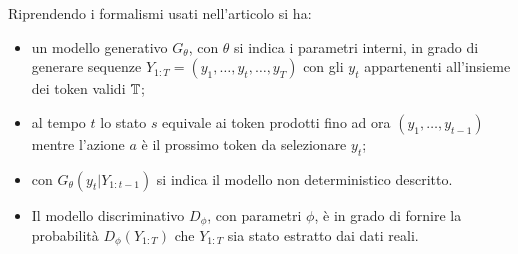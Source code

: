 Riprendendo i formalismi usati nell'articolo si ha:
\begin{itemize}
  \item un modello generativo $G_\theta$, con $\theta$ si indica i parametri interni, in grado di generare sequenze $Y_{1:T} = ( y_1, \dots , y_t, \dots , y_T)$ con gli $y_t$ appartenenti all'insieme dei token validi $\mathbb{T}$;
  \item al tempo $t$ lo stato $s$ equivale ai token prodotti fino ad ora $(y_1, \dots , y_{t-1})$ mentre l'azione $a$ è il prossimo token da selezionare $y_t$;
  \item con $G_\theta (y_t | Y_{1 : t-1} )$ si indica il modello non deterministico descritto.

  \item Il modello discriminativo $D_\phi$, con parametri $\phi$, è in grado di fornire la probabilità $D_\phi ( Y_{1:T})$ che $Y_{1:T}$ sia stato estratto dai dati reali.
\end{itemize}

